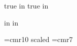 %
%

\sloppy


\def\xpair{{x_1,x_2}}

 true in
 true in
\nopagenumbers

\def\compressedDisplay#1{\vskip -8pt\relax$$#1$$}

 in
 in
\hsize=8in
\vsize=10.5in
\parindent=0pt

\font\bigger =cmr10 scaled
\font\smallfont=cmr7


\def\strutA#1#2{\vrule height#1 depth#2 width0pt}

